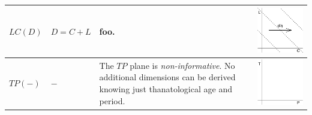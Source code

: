 \documentclass[
  12pt
]{scrartcl}
\begin{document}
\begin{center}
\begin{longtable}{m{}m{}m{}m{}}
  \midrule
  $LC(D)$ & $D = C + L$ &
  foo. &
  \includegraphics[width = \linewidth]{../fig/LCd.pdf} \\
  \midrule
  $TP(-)$ & $-$ &
  The $TP$ plane is \emph{non-informative}. No additional dimensions can be derived knowing just thanatological age and period. &
  \includegraphics[width = \linewidth]{../fig/TP.pdf} \\
  \bottomrule
  \end{longtable}
\end{center}
\end{document}
